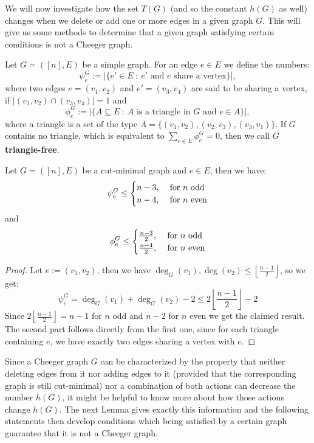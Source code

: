 We will now investigate how the set \(T(G)\) (and so the constant \(h(G)\) as well) changes when we delete or add one or more edges in a given graph \(G\). This will give us some methods to determine that a given graph satisfying certain conditions is not a Cheeger graph.
\begin{defi}
Let \(G=([n],E)\) be a simple graph. For an edge \(e\in E\) we define the numbers:
\[
\psi_e^G:=|\{e'\in E\: :\: e'\text{ and }e\text{ share a vertex}\}|,
\]
where two edges \(e=(v_1,v_2)\) and \(e'=(v_3,v_4)\) are said to be sharing a vertex, if \(|(v_1,v_2)\cap (v_3,v_4)|=1\) and
\[
\phi_e^G:=|\{A\subseteq E\: :\: A\text{ is a triangle in }G\text{ and }e\in A\}|,
\]
where a triangle is a set of the type \(A=\{(v_1,v_2),(v_2,v_3),(v_3,v_1)\}\). If \(G\) contains no triangle, which is equivalent to \(\sum\limits_{e\in E}\phi_e^G=0\), then we call \(G\) \textbf{triangle-free}.
\end{defi}
\begin{lem}\label{lemma2}
Let \(G=([n],E)\) be a cut-minimal graph and \(e\in E\), then we have:
\begin{equation}
\psi_e^G\leq
\begin{cases}
n-3,&\text{ for }n\text{ odd}\notag\\
n-4,&\text{ for }n\text{ even}\notag
\end{cases}
\end{equation}
and
\begin{equation}
\phi_e^G\leq
\begin{cases}
\frac{n-3}{2},&\text{ for }n\text{ odd}\notag\\
\frac{n-4}{2},&\text{ for }n\text{ even}\notag
\end{cases}
\end{equation}
\begin{proof}
Let \(e:=(v_1,v_2)\), then we have \(\deg_G(v_1),\deg(v_2)\leq\left\lfloor\frac{n-1}{2}\right\rfloor\), so we get:
\[
\psi_e^G=\deg_G(v_1)+\deg_G(v_2)-2\leq2\left\lfloor\frac{n-1}{2}\right\rfloor-2
\]
Since \(2\left\lfloor\frac{n-1}{2}\right\rfloor=n-1\) for \(n\) odd and \(n-2\) for \(n\) even we get the claimed result.\\
The second part follows directly from the first one, since for each triangle containing \(e\), we have exactly two edges sharing a vertex with \(e\).
\end{proof}
\end{lem}
Since a Cheeger graph \(G\) can be characterized by the property that neither deleting edges from it nor adding edges to it (provided that the corresponding graph is still cut-minimal) nor a combination of both actions can decrease the number \(h(G)\), it might be helpful to know more about how those actions change \(h(G)\). The next Lemma gives exactly this information and the following statements then develop conditions which being satisfied by a certain graph guarantee that it is not a Cheeger graph.
